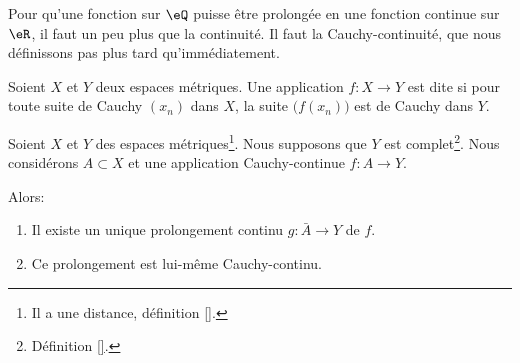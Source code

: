 Pour qu'une fonction sur \( \eQ\) puisse être prolongée en une fonction continue sur \( \eR\), il faut un peu plus que la continuité. Il faut la Cauchy-continuité, que nous définissons pas plus tard qu'immédiatement.

\begin{definition}      \label{DEFooXXOGooXblyKP}
	Soient \( X\) et \( Y\) deux espaces métriques. Une application \( f\colon X\to Y\) est dite  si pour toute suite de Cauchy \( (x_n)\) dans \( X\), la suite \( \big( f(x_n) \big)\) est de Cauchy dans \( Y\).
\end{definition}

\begin{proposition}
    Soient \( X\) et \( Y\) des espaces métriques\footnote{Il a une distance, définition \ref{}.}. Nous supposons que \( Y\) est complet\footnote{Définition \ref{}.}. Nous considérons \( A\subset X\) et une application Cauchy-continue \( f\colon A\to Y\). 

    Alors:
    \begin{enumerate}
        \item
            Il existe un unique prolongement continu \( g\colon \bar A\to Y\) de \( f\).
        \item       \label{ITEMooDEZGooUAvwvF}
            Ce prolongement est lui-même Cauchy-continu.
    \end{enumerate}
\end{proposition}

